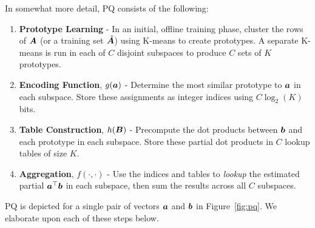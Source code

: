 In somewhat more detail, PQ consists of the following:
\vspace{-3mm}
\begin{enumerate}\itemsep.5mm
    \item \textbf{Prototype Learning} - In an initial, offline training phase,  cluster the rows of $\bm{A}$ (or a training set $\tilde{\bm{A}}$) using K-means to create prototypes. A separate K-means is run in each of $C$ disjoint subspaces to produce $C$ sets of $K$ prototypes. %
    \item \textbf{Encoding Function}, $g(\bm{a})$ - Determine the most similar prototype to $\bm{a}$ in each subspace. Store these assignments as integer indices using $C \log_2(K)$ bits.
    \item \textbf{Table Construction}, $h(\bm{B})$ - Precompute the dot products between $\bm{b}$ and each prototype in each subspace. Store these partial dot products in $C$ lookup tables of size $K$.
    \item \textbf{Aggregation}, $f(\cdot,\cdot)$ - Use the indices and tables to \textit{lookup} the estimated partial $\bm{a}^\top \bm{b}$ in each subspace, then sum the results across all $C$ subspaces. %
\end{enumerate}
\vspace{-3mm}
PQ is depicted for a single pair of vectors $\bm{a}$ and $\bm{b}$ in Figure~\ref{fig:pq}. We elaborate upon each of these steps below.

\vspace{-2mm}
